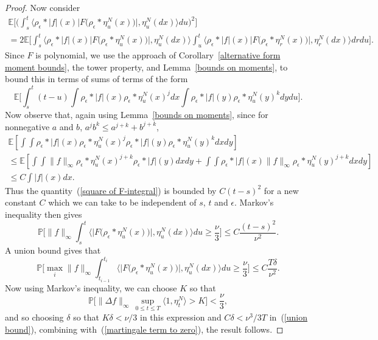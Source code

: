\documentclass[EJP]{ejpecp} %
\newcommand{\IP}{\mathbb P}
\newcommand{\IE}{\mathbb E}
\begin{document}
\begin{proof}
Now consider
\begin{multline}
	\label{square of F-integral}
\IE\Big[
	\Big(\int_s^t\big\langle\rho_\epsilon*|f|(x) \big|F\big(\rho_\epsilon*\eta_u^N(x)\big)\big|,
\eta_u^N(dx)\big\rangle du\Big)^2\Big]
\\
=
2\IE\Big[
	\int_s^t\big\langle\rho_\epsilon*|f|(x) \big|F\big(\rho_\epsilon*\eta_u^N(x)\big)\big|,
\eta_u^N(dx)\big\rangle 
	\int_u^t\big\langle \rho_\epsilon*|f|(x)\big|F\big(\rho_\epsilon*\eta_r^N(x)\big)\big|,
\eta_r^N(dx)\big\rangle dr
du\Big].
\end{multline}
Since $F$ is polynomial, we use the approach
of Corollary~\ref{alternative form moment bounds}, the tower 
property, and 
Lemma~\ref{bounds on moments}, to bound this
in terms of sums of terms of the form
\[
\IE\Big[\int_s^t(t-u)\int\rho_\epsilon*|f|(x)\rho_\epsilon*\eta_u^N(x)^jdx
\int\rho_\epsilon*|f|(y)\rho_\epsilon*\eta_u^N(y)^kdydu\Big].
\]
Now observe that, again using Lemma~\ref{bounds on moments}, 
since for nonnegative $a$ and $b$, $a^j b^k \le a^{j+k} + b^{j+k}$,
\begin{multline*}
	\IE\left[	\int\int\rho_\epsilon*|f|(x)\rho_\epsilon*\eta_u^N(x)^j
	\rho_\epsilon*|f|(y)\rho_\epsilon*\eta_u^N(y)^k dx dy\right]
	\\
	\leq
	\IE\left[\int\int\|f\|_\infty\rho_\epsilon*\eta_u^N(x)^{j+k}
	\rho_\epsilon*|f|(y)
	dx dy
+
	\int\int
	\rho_\epsilon*|f|(x)
	\|f\|_\infty
	\rho_\epsilon*\eta_u^N(y)^{j+k}
	dx dy \right]
	\\ \leq C\int |f|(x)dx.
\end{multline*}
Thus the quantity~(\ref{square of F-integral}) 
is bounded by $C(t-s)^2$ for a new constant $C$ which we can 
take to be independent of $s$, $t$ and $\epsilon$. Markov's inequality 
then gives
\[
\IP\Big[\|f\|_\infty\int_s^t
\big\langle \big|F\big(\rho_\epsilon*\eta_u^N(x)\big)\big|,
\eta_u^N(dx)\big\rangle du \geq \frac{\nu}{3}\Big]
\leq C\frac{(t-s)^2}{\nu^2}.
\]
A union bound gives that
\begin{equation}
\label{union bound}
\IP\Big[\max_i\|f\|_\infty\int_{t_{i-1}}^{t_i}
\big\langle \big|F\big(\rho_\epsilon*\eta_u^N(x)\big)\big|,
\eta_u^N(dx)\big\rangle du \geq \frac{\nu}{3}\Big]
\leq C\frac{T\delta}{\nu^2}.
\end{equation}
Now using Markov's inequality, we can choose $K$ so that
\[
\IP\Big[\|\Delta f\|_\infty\, \sup_{0\leq t\leq T} \langle 1,\eta_t^N\rangle 
>K\Big]<\frac{\nu}{3}, 
\]
and so choosing $\delta$ so that $K\delta<\nu/3$ in this 
expression and $C\delta<\nu^3/3T$ in~(\ref{union bound}),
combining with~(\ref{martingale term to zero}), the result follows.
\end{proof}
\end{document}
